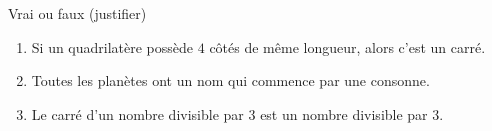 
\begin{exercice}\label{exosmath-0791}

Vrai ou faux (justifier)
\begin{enumerate}
    \item
        Si un quadrilatère possède $4$ côtés de même longueur, alors c'est un carré.
    \item
        Toutes les planètes ont un nom qui commence par une consonne.
    \item
        Le carré d'un nombre divisible par \( 3\) est un nombre divisible par \( 3\).
\end{enumerate}

\end{exercice}
